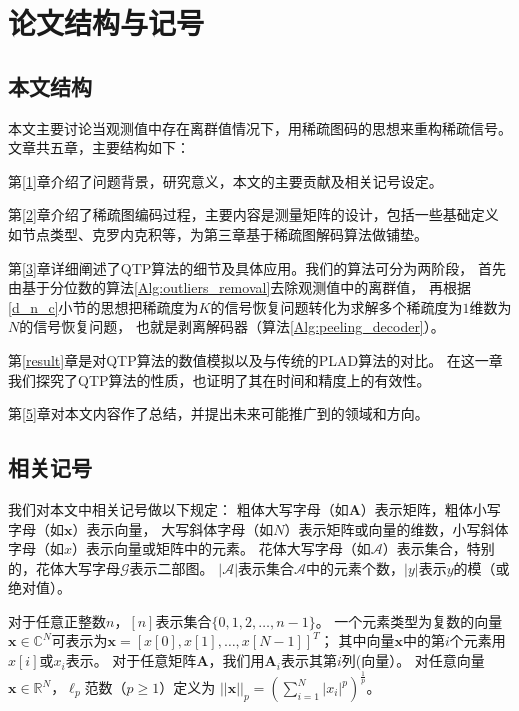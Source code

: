 \documentclass[AutoFakeBold]{LZUThesis}
\begin{document}
\section{论文结构与记号}

\subsection{本文结构}

本文主要讨论当观测值中存在离群值情况下，用稀疏图码的思想来重构稀疏信号。文章共五章，主要结构如下：

第\ref{1}章介绍了问题背景，研究意义，本文的主要贡献及相关记号设定。

第\ref{2}章介绍了稀疏图编码过程，主要内容是测量矩阵的设计，包括一些基础定义如节点类型、克罗内克积等，为第三章基于稀疏图解码算法做铺垫。

第\ref{3}章详细阐述了QTP算法的细节及具体应用。我们的算法可分为两阶段，
首先由基于分位数的算法\ref{Alg:outliers_removal}去除观测值中的离群值，
再根据\ref{d_n_c}小节的思想把稀疏度为$K$的信号恢复问题转化为求解多个稀疏度为$1$维数为$N$的信号恢复问题，
也就是剥离解码器（算法\ref{Alg:peeling_decoder}）。

第\ref{result}章是对QTP算法的数值模拟以及与传统的PLAD算法的对比。
在这一章我们探究了QTP算法的性质，也证明了其在时间和精度上的有效性。

第\ref{5}章对本文内容作了总结，并提出未来可能推广到的领域和方向。

\subsection{相关记号}

我们对本文中相关记号做以下规定：
粗体大写字母（如$\mathbf{A}$）表示矩阵，粗体小写字母（如$\mathbf{x}$）表示向量，
大写斜体字母（如$N$）表示矩阵或向量的维数，小写斜体字母（如$x$）表示向量或矩阵中的元素。
花体大写字母（如$\mathcal{A}$）表示集合，特别的，花体大写字母$\mathcal{G}$表示二部图。
$|\mathcal{A}|$表示集合$\mathcal{A}$中的元素个数，$|y|$表示$y$的模（或绝对值）。

对于任意正整数$n$，$[n]$表示集合$\{0, 1, 2, \dots, n-1\}$。
一个元素类型为复数的向量$\mathbf{x} \in \mathbb{C}^{N}$可表示为$\mathbf{x} = [x[0], x[1], \dots, x[N-1]]^T$；
其中向量$\mathbf{x}$中的第$i$个元素用$x[i]$或$x_i$表示。
对于任意矩阵$\mathbf{A}$，我们用$\mathbf{A}_i$表示其第$i$列(向量）。
对任意向量$\mathbf{x} \in \mathbb{R}^N$，$\ell_p$范数（$p \geq 1$）定义为
$||\mathbf{x}||_p = (\sum_{i=1}^N |x_i|^p)^{\frac{1}{p}}$。
\end{document}
